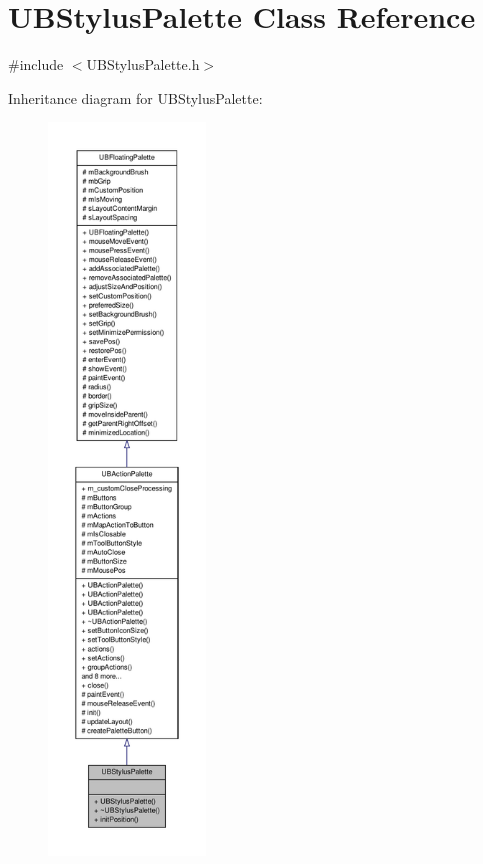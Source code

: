 \hypertarget{class_u_b_stylus_palette}{\section{U\-B\-Stylus\-Palette Class Reference}
\label{d2/dfd/class_u_b_stylus_palette}
}


{\ttfamily \#include $<$U\-B\-Stylus\-Palette.\-h$>$}



Inheritance diagram for U\-B\-Stylus\-Palette\-:
\nopagebreak
\begin{figure}[H]
\begin{center}
\leavevmode
\includegraphics[height=550pt]{dc/d51/class_u_b_stylus_palette__inherit__graph}
\end{center}
\end{figure}


